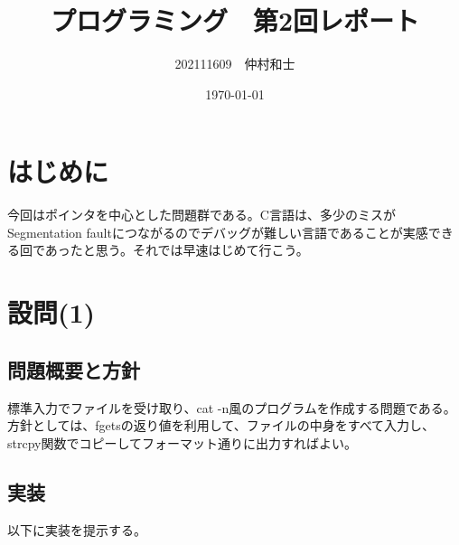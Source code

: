 \documentclass[dvipdfmx,12pt,a4j]{jarticle}
\title{プログラミング　第2回レポート}
\author{202111609　仲村和士}
\date{\today}
\begin{document}
\maketitle

\section{はじめに}
今回はポインタを中心とした問題群である。C言語は、多少のミスがSegmentation faultにつながるのでデバッグが難しい言語であることが実感できる回であったと思う。それでは早速はじめて行こう。

\section{設問(1)}
\subsection{問題概要と方針}
標準入力でファイルを受け取り、cat -n風のプログラムを作成する問題である。方針としては、fgetsの返り値を利用して、ファイルの中身をすべて入力し、strcpy関数でコピーしてフォーマット通りに出力すればよい。

\subsection{実装}
以下に実装を提示する。

\end{document}
